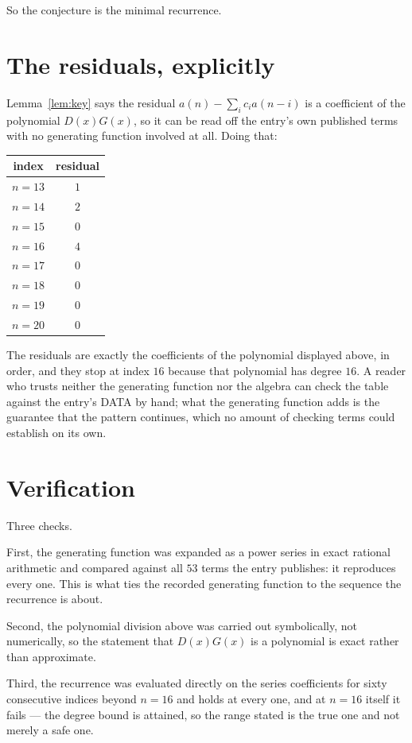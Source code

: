 \documentclass[11pt,a4paper]{article}
\theoremstyle{plain}
\theoremstyle{definition}
\begin{document}
So the conjecture is the minimal recurrence.

\section{The residuals, explicitly}

Lemma~\ref{lem:key} says the residual $a(n)-\sum_ic_ia(n-i)$ is a coefficient of the
polynomial $D(x)G(x)$, so it can be read off the entry's own published terms with no
generating function involved at all. Doing that:
\begin{center}
\begin{tabular}{cc}
index & residual \\ \hline
$n=13$ & $1$ \\
$n=14$ & $2$ \\
$n=15$ & $0$ \\
$n=16$ & $4$ \\
$n=17$ & $0$ \\
$n=18$ & $0$ \\
$n=19$ & $0$ \\
$n=20$ & $0$
\end{tabular}
\end{center}
The residuals are exactly the coefficients of the polynomial displayed above, in order, and
they stop at index $16$ because that polynomial has degree $16$. A reader who trusts
neither the generating function nor the algebra can check the table against the entry's DATA
by hand; what the generating function adds is the guarantee that the pattern continues, which
no amount of checking terms could establish on its own.

\section{Verification}

Three checks.

First, the generating function was expanded as a power series in exact rational arithmetic and
compared against all $53$ terms the entry publishes: it reproduces every one. This is
what ties the recorded generating function to the sequence the recurrence is about.

Second, the polynomial division above was carried out symbolically, not numerically, so the
statement that $D(x)G(x)$ is a polynomial is exact rather than approximate.

Third, the recurrence was evaluated directly on the series coefficients for sixty consecutive
indices beyond $n=16$ and holds at every one, and at $n=16$ itself it fails --- the
degree bound is attained, so the range stated is the true one and not merely a safe one.
\end{document}
